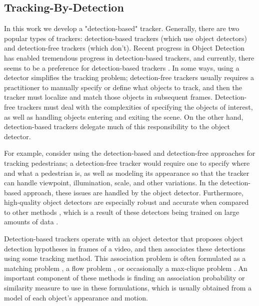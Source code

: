 \documentclass[10pt,twocolumn,letterpaper]{article}
\begin{document}
\subsection{Tracking-By-Detection}
In this work we develop a "detection-based" tracker.
Generally, there are two popular types of trackers: detection-based trackers (which use object detectors) and detection-free trackers (which don't).
Recent progress in Object Detection \cite{cvpr2019challenge} has enabled tremendous progress in detection-based trackers, and currently, there seems to be a preference for detection-based trackers \cite{dendorfer2019cvpr19}.
In some ways, using a detector simplifies the tracking problem; detection-free trackers usually requires a practitioner to manually specify or define what objects to track, and then the tracker must localize and match those objects in subsequent frames. Detection-free trackers must deal with the complexities of specifying the objects of interest, as well as handling objects entering and exiting the scene. On the other hand, detection-based trackers delegate much of this responsibility to the object detector.

For example, consider using the detection-based and detection-free approaches for tracking pedestrians; a detection-free tracker would require one to specify where and what a pedestrian is, as well as modeling its appearance so that the tracker can handle viewpoint, illumination, scale, and other variations.
In the detection-based approach, these issues are handled by the object detector. Furthermore, high-quality object detectors are especially robust and accurate when compared to other methods \cite{liu2018deep}, which is a result of these detectors being trained on large amounts of data \cite{s2018mobilenetv2}.

Detection-based trackers operate with an object detector that proposes object detection hypotheses in frames of a video, and then associates these detections using some tracking method. This association problem is often formulated as a matching problem  \cite{SORT} \cite{bayesian_mot} \cite{identity_linking_under_split} \cite{detect_and_track}, a flow problem \cite{deepflow} \cite{lenz2014followme}, or occasionally a max-clique problem \cite{max_clique}. An important component of these methods is finding an association probability or similarity measure to use in these formulations, which is usually obtained from a model of each object's appearance and motion.
\end{document}
